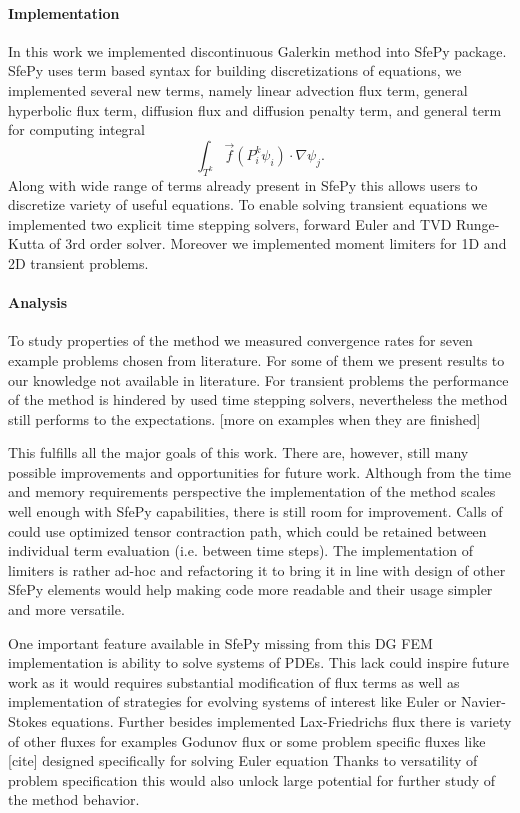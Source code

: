 \paragraph{Implementation}
In this work we implemented discontinuous Galerkin method into SfePy package. 
SfePy uses term based syntax for building discretizations of equations, we implemented 
several new terms, namely linear advection flux term, general hyperbolic flux term, 
diffusion flux and diffusion penalty term, and general term for computing integral
$$
\int_{T^k} \vec{f}(P_i^k\psi_i)\cdot\nabla\psi_j. 
$$
Along with wide range of terms already present in SfePy this allows users to 
discretize variety of useful equations. To enable solving transient equations we 
implemented two explicit time stepping solvers, forward Euler and TVD Runge-Kutta of 3rd 
order solver. Moreover we implemented moment limiters for 1D and 2D transient 
problems.

\paragraph{Analysis}
To study properties of the method we measured convergence rates for seven 
example 
problems chosen from literature. For some of them we present results to our 
knowledge not 
available in literature. For transient problems the performance of the method 
is hindered 
by used time stepping solvers, nevertheless the method still performs to the 
expectations.
[\todo more on examples when they are finished]

This fulfills all the major goals of this work. There are, however, still many possible 
improvements and opportunities for future work. Although from the time and memory 
requirements perspective the implementation of the method scales well enough with SfePy 
capabilities, there is still room for improvement. Calls of  could 
use optimized tensor contraction path, which could be retained between individual term 
evaluation (i.e. between time steps). The implementation of limiters is rather ad-hoc and 
refactoring it to bring it in line with design of other SfePy elements would help making 
code more readable and their usage simpler and more versatile. 

One important feature available in SfePy missing from this DG FEM 
implementation is ability to solve systems of PDEs. This lack could inspire future work 
as it would requires substantial modification of flux terms as well as implementation of  
strategies for evolving systems of interest like Euler or Navier-Stokes 
equations. Further besides implemented Lax-Friedrichs flux there is variety of other 
fluxes for examples Godunov flux or some problem specific fluxes like [\todo cite] 
designed specifically for solving Euler equation Thanks to versatility of problem 
specification this would also unlock large potential for further study of the method 
behavior. 

